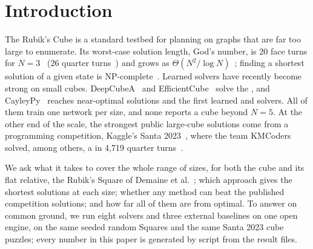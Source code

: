 \section{Introduction}
\label{sec:intro}

The  Rubik's Cube is a standard testbed for planning on graphs that are far too large to
enumerate. Its worst-case solution length, God's number, is 20 face turns for $N=3$~\cite{rokicki2014diameter}
(26 quarter turns~\cite{rokicki2014qtm}) and grows as $\Theta(N^2/\log N)$~\cite{demaine2011algorithms};
finding a shortest solution of a given state is NP-complete~\cite{demaine2018npcomplete}. Learned solvers
have recently become strong on small cubes. DeepCubeA~\cite{agostinelli2019deepcubea} and
EfficientCube~\cite{takano2023selfsupervision} solve the , and CayleyPy~\cite{chervov2025cayleypy}
reaches near-optimal  solutions and the first learned  and  solvers. All of them train one
network per size, and none reports a cube beyond $N=5$. At the other end of the scale, the strongest public
large-cube solutions come from a programming competition, Kaggle's Santa 2023~\cite{kaggle2023santa}, where
the team KMCoders solved, among others, a  in 4,719 quarter turns~\cite{kmcoders2024santa}.

We ask what it takes to cover the whole range of sizes, for both the cube and its flat relative, the 
Rubik's Square of Demaine et al.~\cite{demaine2011algorithms}; which approach gives the shortest solutions at
each size; whether any method can beat the published competition solutions; and how far all of them are
from optimal. To answer on common ground, we run eight solvers and three external baselines on one open engine,
on the same seeded random Squares and the same Santa 2023 cube puzzles; every number in this paper is generated
by script from the result files.

